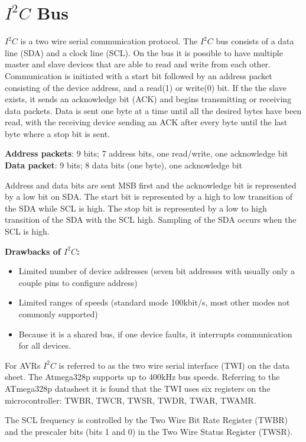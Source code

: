 \section{$I^{2}C$ Bus}
$I^{2}C$ is a two wire serial communication protocol.  The $I^{2}C$ bus consists of a data line (SDA) and a clock line (SCL).  On the bus it is possible to have multiple master and slave devices that are able to read and write from each other.  
	Communication is initiated with a start bit followed by an address packet consisting of the device address, and a read(1) or write(0) bit.  If the the slave exists, it sends an acknowledge bit (ACK) and begins transmitting or receiving data packets.  Data is sent one byte at a time until all the desired bytes have been read, with the receiving device sending an ACK after every byte until the last byte where a stop bit is sent.

	\textbf{Address packets}: 9 bits; 7 address bits, one read/write, one acknowledge bit
	\textbf{Data packet}: 9 bits; 8 data bits (one byte), one acknowledge bit

Address and data bits are sent MSB first and the acknowledge bit is represented by a low bit on SDA.  The start bit is represented by a high to low transition of the SDA while SCL is high.  The stop bit is represented by a low to high transition of the SDA with the SCL high.  Sampling of the SDA occurs when the SCL is high.  

\textbf{Drawbacks of $I^{2}C$:}
\begin{itemize}
\item Limited number of device addresses (seven bit addresses with usually only a couple pins to configure address)
\item Limited ranges of speeds (standard mode 100kbit/s, most other modes not commonly supported)
\item Because it is a shared bus, if one device faults, it interrupts communication for all devices.
\end{itemize}

For AVRs $I^{2}C$ is referred to as the two wire serial interface (TWI) on the data sheet. The Atmega328p supports up to 400kHz bus speeds. Referring to the ATmega328p datasheet it is found that the TWI uses six registers on the microcontroller: TWBR, TWCR, TWSR, TWDR, TWAR, TWAMR.

The SCL frequency is controlled by the Two Wire Bit Rate Register (TWBR) and the prescaler bits (bits 1 and 0) in the Two Wire Status Register (TWSR).

